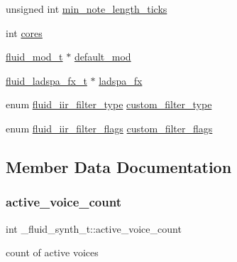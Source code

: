 \begin{DoxyCompactItemize}
\item 
unsigned int \hyperlink{struct__fluid__synth__t_a08ef94fb04d2219ec10bdd1f87d50209}{min\+\_\+note\+\_\+length\+\_\+ticks}
\item 
int \hyperlink{struct__fluid__synth__t_adb607a968ba73c99321e87519f57148f}{cores}
\item 
\hyperlink{types_8h_a6c727efab500d6c0c350d4292e9aa5ef}{fluid\+\_\+mod\+\_\+t} $\ast$ \hyperlink{struct__fluid__synth__t_a1ac7f01b534bc2eb5d49733312ed6f6a}{default\+\_\+mod}
\item 
\hyperlink{types_8h_a4cb127fbe32ac21781d5252c75661191}{fluid\+\_\+ladspa\+\_\+fx\+\_\+t} $\ast$ \hyperlink{struct__fluid__synth__t_a5af386f876599f6b037976be866c89ce}{ladspa\+\_\+fx}
\item 
enum \hyperlink{synth_8h_a8a4cb4bd240d3654707ac0c5c7337a63}{fluid\+\_\+iir\+\_\+filter\+\_\+type} \hyperlink{struct__fluid__synth__t_a32b1a8f42c060a715fda78d4ae4a51ee}{custom\+\_\+filter\+\_\+type}
\item 
enum \hyperlink{synth_8h_a1e682c5d6f22e13947cc07bcd92d7525}{fluid\+\_\+iir\+\_\+filter\+\_\+flags} \hyperlink{struct__fluid__synth__t_a2921a891ef8a9ebc584acfc9605177be}{custom\+\_\+filter\+\_\+flags}
\end{DoxyCompactItemize}


\subsection{Member Data Documentation}
\mbox{\label{struct__fluid__synth__t_a6137bdab89209777a7a63d5f968d7143}} 
\subsubsection{\texorpdfstring{active\+\_\+voice\+\_\+count}{active\_voice\_count}}
{\footnotesize\ttfamily int \+\_\+fluid\+\_\+synth\+\_\+t\+::active\+\_\+voice\+\_\+count}

count of active voices \mbox{\label{struct__fluid__synth__t_a35c32add2f161d86d837301c9b6d67e7}} 
